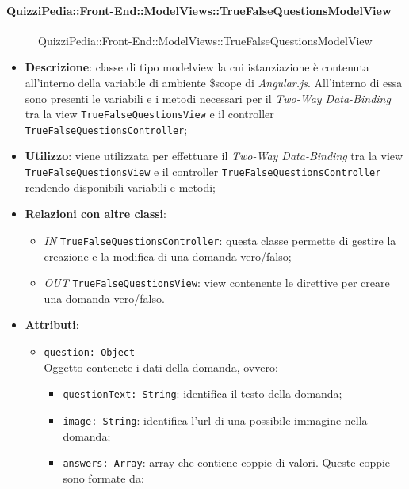 \paragraph{QuizziPedia::Front-End::ModelViews::TrueFalseQuestionsModelView}
\begin{figure} [ht]
	\centering
	\caption{QuizziPedia::Front-End::ModelViews::TrueFalseQuestionsModelView}
\end{figure} \FloatBarrier
\begin{itemize}
	\item \textbf{Descrizione}: classe di tipo modelview la cui istanziazione è contenuta all'interno della variabile di ambiente \$scope di \textit{Angular.js}. All'interno di essa sono presenti le variabili e i metodi necessari per il \textit{Two-Way Data-Binding} tra la view \texttt{TrueFalseQuestionsView} e il controller \texttt{TrueFalseQuestionsController}; 
	\item \textbf{Utilizzo}: viene utilizzata per effettuare il \textit{Two-Way Data-Binding} tra la view \texttt{TrueFalseQuestionsView} e il controller \texttt{TrueFalseQuestionsController} rendendo disponibili variabili e metodi;
	\item \textbf{Relazioni con altre classi}:
	\begin{itemize}
		\item \textit{IN} \texttt{TrueFalseQuestionsController}: questa classe permette di gestire la creazione e la modifica di una domanda vero/falso;
		\item \textit{OUT} \texttt{TrueFalseQuestionsView}: view contenente le direttive per creare una domanda vero/falso.
	\end{itemize}
	\item \textbf{Attributi}:
	\begin{itemize}
	  \item \texttt{question: Object} \\ Oggetto contenete i dati della domanda, ovvero:
	  \begin{itemize}
		\item \texttt{questionText: String}: identifica il testo della domanda;
		\item \texttt{image: String}: identifica l'url di una possibile immagine nella domanda;
		\item \texttt{answers: Array}: array che contiene coppie di valori. Queste coppie sono formate da:
		\begin{itemize}

\end{itemize}
\end{itemize}
\end{itemize}
\end{itemize}
